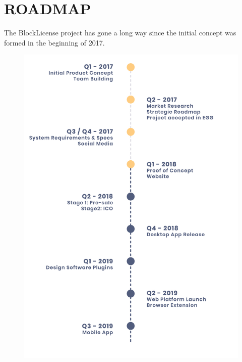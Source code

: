 \newpage
\section{ROADMAP} \label{roadmap}

The BlockLicense project has gone a long way since the initial concept was formed in the beginning of 2017. 

\begin{figure}[h]
\centering
\begin{minipage}{1\textwidth}
  \centering
  \includegraphics[width=.65\linewidth]{./figures/fig8.jpg}
\end{minipage}%
\end{figure}